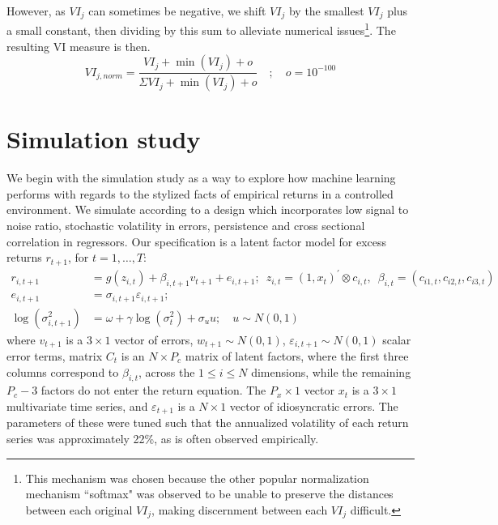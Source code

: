 \documentclass{article}
\begin{document}
However, as $VI_j$ can sometimes be negative, we shift $VI_j$ by the smallest $VI_j$ plus a small constant, then dividing by this sum to alleviate numerical issues\footnote{This mechanism was chosen because the other popular normalization mechanism ``softmax" was observed to be unable to preserve the distances between each original $VI_j$, making discernment between each $VI_j$ difficult.}. The resulting VI measure is then. 
\begin{equation}
VI_{j, norm} = \frac{VI_j + \operatorname{min}(VI_j) + o}
{\Sigma VI_j + \operatorname{min}(VI_j) + o} \quad ; \quad o = 10^{-100}
\end{equation}

\section{Simulation study}
We begin with the simulation study as a way to explore how machine learning performs with regards to the stylized facts of empirical returns in a controlled environment. We simulate according to a design which incorporates low signal to noise ratio, stochastic volatility in errors, persistence and cross sectional correlation in regressors. Our specification is a latent factor model for excess returns $r_{t+1}$, for $t=1, \dots, T$:
\begin{align}
r_{i, t+1} &= 
g\left(z_{i, t}\right) + \beta_{i,t+1}v_{t+1} + e_{i, t+1}; 
\enspace z_{i, t} = \left(1, x_{t}\right)^{\prime} \otimes c_{i, t}, 
\enspace \beta_{i, t} = \left(c_{i 1, t}, c_{i 2, t}, c_{i 3, t}\right) \\ 
e_{i, t+1} &= 
\sigma_{i, t+1} \varepsilon_{i, t+1}; \\
\operatorname{log} (\sigma^2_{i,t+1}) &= 
\omega + \gamma \operatorname{log} (\sigma^2_{t}) + \sigma_{u}u;
\quad u \sim N(0, 1)
\end{align}
where $v_{t+1}$ is a $3\times 1$ vector of errors, $w_{t+1} \sim N(0, 1)$,  $\varepsilon_{i,t+1} \sim N(0, 1)$ scalar error terms, matrix $C_t$ is an $N\times P_c$ matrix of latent factors, where the first three columns correspond to $\beta_{i,t}$, across the $1\leq i\leq N$ dimensions, while the remaining $P_c-3$ factors do not enter the return equation. The $P_x\times1$ vector $x_t$ is a $3 \times 1$ multivariate time series, and $\varepsilon_{t+1}$ is a $N\times 1$ vector of idiosyncratic errors. The parameters of these were tuned such that the annualized volatility of each return series was approximately 22\%, as is often observed empirically.
\end{document}
